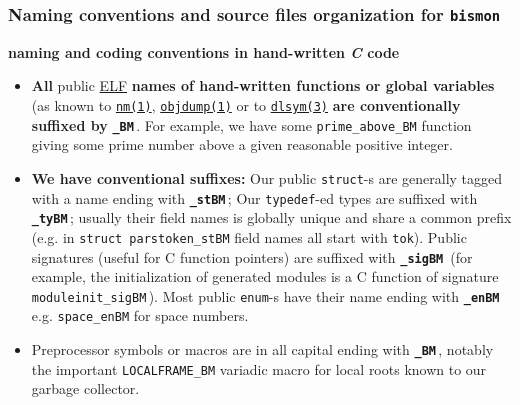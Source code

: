 \subsubsection{Naming conventions and source files organization for \texttt{bismon}}

\medskip

{\large \textbf{naming and coding conventions in hand-written \emph{C} code}}

\begin{itemize}

  \item \textbf{All} public
    \href{https://en.wikipedia.org/wiki/Executable_and_Linkable_Format}{ELF}
    \textbf{names of hand-written functions or global variables} (as
    known to
    \href{https://man7.org/linux/man-pages/man1/nm.1.html}{\texttt{nm(1)}},
    \href{https://man7.org/linux/man-pages/man1/objdump.1.html}{\texttt{objdump(1)}}
    or to
    \href{https://man7.org/linux/man-pages/man3/dlsym.3.html}{\texttt{dlsym(3)}}
    \textbf{are conventionally suffixed by}
           {\texttt{\textbf{\_BM}}}\,. For example, we have some
           \texttt{prime\_above\_BM} function giving some prime number
           above a given reasonable positive integer.

\item \textbf{We have conventional suffixes:} Our public
  \texttt{struct}-s are generally tagged with a name ending with
         {\texttt{\textbf{\_stBM}}}\,; Our \texttt{typedef}-ed types
         are suffixed with {\texttt{\textbf{\_tyBM}}}\,; usually their
         field names is globally unique and share a common prefix
         (e.g. in \texttt{struct parstoken\_stBM} field names all
         start with \texttt{tok}). Public signatures (useful for C
         function pointers) are suffixed with
         {\texttt{\textbf{\_sigBM}}}\, (for example, the
         initialization of generated modules is a C function of
         signature \texttt{moduleinit\_sigBM}\,). Most public
         \texttt{enum}-s have their name ending with
                {\texttt{\textbf{\_enBM}}}\, e.g. \texttt{space\_enBM}
                for space numbers.

              \item Preprocessor symbols or macros are in all capital
                ending with {\texttt{\textbf{\_BM}}}\,, notably the
                important \texttt{LOCALFRAME\_BM} variadic macro for
                local roots known to our garbage collector.
\end{itemize}

